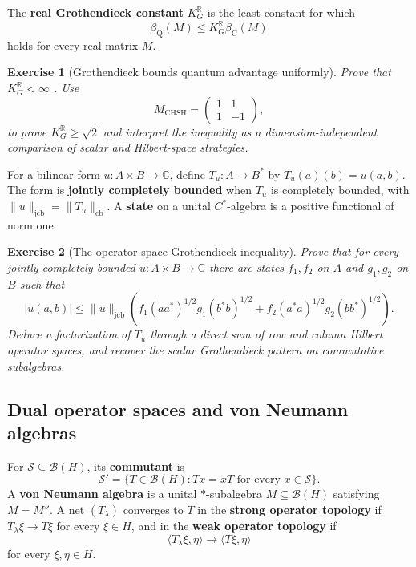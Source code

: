 \documentclass{article}
\newtheorem{exercise}{Exercise}
\begin{document}
The \textbf{real Grothendieck constant} $K_G^{\mathbb R}$ is the least constant for which
\[
\beta_{\mathrm Q}(M)\leq K_G^{\mathbb R}\beta_{\mathrm C}(M)
\]
holds for every real matrix $M$.

\begin{exercise}[Grothendieck bounds quantum advantage uniformly]
\leavevmode\par
\textit{Prove that $K_G^{\mathbb R}<\infty$ \cite{grothendieck}. Use}
\[
M_{\mathrm{CHSH}}=
\begin{pmatrix}1&1\\1&-1\end{pmatrix},
\]
\textit{to prove $K_G^{\mathbb R}\geq\sqrt2$ and interpret the inequality as
a dimension-independent comparison of scalar and Hilbert-space strategies.}
\end{exercise}

For a bilinear form $u:A\times B\to\mathbb C$, define
$T_u:A\to B^*$ by $T_u(a)(b)=u(a,b)$. The form is
\textbf{jointly completely bounded} when $T_u$ is completely bounded, with
$\|u\|_{\mathrm{jcb}}=\|T_u\|_{\mathrm{cb}}$. A \textbf{state} on a unital
$C^*$-algebra is a positive functional of norm one.

\begin{exercise}[The operator-space Grothendieck inequality]
\leavevmode\par
\textit{Prove that for every jointly completely bounded
$u:A\times B\to\mathbb C$ there are states $f_1,f_2$ on $A$ and $g_1,g_2$
on $B$ such that} \cite{haagerup-musat}
\[
|u(a,b)|\leq\|u\|_{\mathrm{jcb}}
\left(
f_1(aa^*)^{1/2}g_1(b^*b)^{1/2}
+f_2(a^*a)^{1/2}g_2(bb^*)^{1/2}
\right).
\]
\textit{Deduce a factorization of $T_u$ through a direct sum of row and
column Hilbert operator spaces, and recover the scalar Grothendieck pattern
on commutative subalgebras.}
\end{exercise}

\subsection{Dual operator spaces and von Neumann algebras}

For $\mathcal S\subseteq\mathcal B(H)$, its \textbf{commutant} is
\[
\mathcal S'=\{T\in\mathcal B(H):Tx=xT\text{ for every }x\in\mathcal S\}.
\]
A \textbf{von Neumann algebra} is a unital $*$-subalgebra $M\subseteq\mathcal B(H)$ satisfying $M=M''$. A net $(T_\lambda)$ converges to $T$ in the \textbf{strong operator topology} if $T_\lambda\xi\to T\xi$ for every $\xi\in H$, and in the \textbf{weak operator topology} if
\[
\langle T_\lambda\xi,\eta\rangle\longrightarrow\langle T\xi,\eta\rangle
\]
for every $\xi,\eta\in H$.
\end{document}
